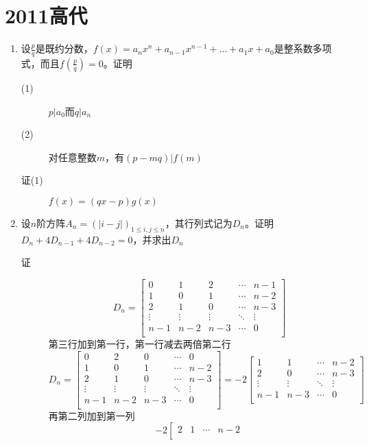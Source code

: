 \section{2011高代}
\begin{enumerate}
\item 设$\frac{p}{q}$是既约分数，$f(x)=a_nx^n+a_{n-1}x^{n-1}+\dots+a_1x+a_0$是整系数多项式，而且$f(\frac{p}{q})=0$。证明
\begin{description}
\item[(1)] $p|a_0$而$q|a_n$
\item[(2)] 对任意整数$m$，有$(p-mq)|f(m)$
\item[证(1)] $f(x)=(qx-p)g(x)$
\end{description}

\item 设$n$阶方阵$A_n=(|i-j|)_{1\leq i,j \leq n}$，其行列式记为$D_n$。证明$D_n+4D_{n-1}+4D_{n-2}=0$，并求出$D_n$
\begin{description}
\item[证]
\[
D_n = \left[
\begin{array}{ccccc}
0 & 1 & 2 & \cdots & n-1 \\
1 & 0 & 1 & \cdots & n-2 \\
2 & 1 & 0 & \cdots & n-3 \\
\vdots & \vdots & \vdots & \ddots & \vdots \\
n-1 & n-2 & n-3 & \cdots & 0 \\
\end{array}\right]
\]
第三行加到第一行，第一行减去两倍第二行
\[
D_n = \left[
\begin{array}{ccccc}
0 & 2 & 0 & \cdots & 0 \\
1 & 0 & 1 & \cdots & n-2 \\
2 & 1 & 0 & \cdots & n-3 \\
\vdots & \vdots & \vdots & \ddots & \vdots \\
n-1 & n-2 & n-3 & \cdots & 0 \\
\end{array}\right] = -2 \left[
\begin{array}{cccc}
1 & 1 & \cdots & n-2 \\
2 & 0 & \cdots & n-3 \\
\vdots & \vdots & \ddots & \vdots \\
n-1 & n-3 & \cdots & 0 \\
\end{array}\right]
\]
再第二列加到第一列
\[
-2 \left[
\begin{array}{cccc}
2 & 1 & \cdots & n-2 \\

\end{array}\]
\end{description}
\end{enumerate}
